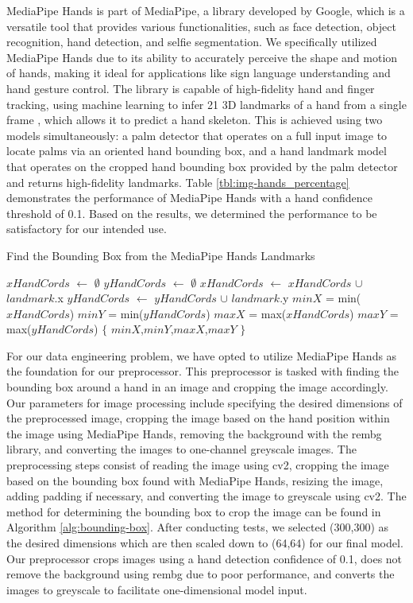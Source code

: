 \documentclass[a4paper]{article}
\begin{document}
MediaPipe Hands is part of MediaPipe, a library developed by Google, which is a versatile tool that provides various functionalities, such as face detection, object recognition, hand detection, and selfie segmentation. We specifically utilized MediaPipe Hands due to its ability to accurately perceive the shape and motion of hands, making it ideal for applications like sign language understanding and hand gesture control. The library is capable of high-fidelity hand and finger tracking, using machine learning to infer 21 3D landmarks of a hand from a single frame \citep{mediapipe}, which allows it to predict a hand skeleton. This is achieved using two models simultaneously: a palm detector that operates on a full input image to locate palms via an oriented hand bounding box, and a hand landmark model that operates on the cropped hand bounding box provided by the palm detector and returns high-fidelity landmarks. Table \ref{tbl:img-hands_percentage} demonstrates the performance of MediaPipe Hands with a hand confidence threshold of 0.1. Based on the results, we determined the performance to be satisfactory for our intended use.

\begin{algorithm}
	\caption{Find the Bounding Box from the MediaPipe Hands Landmarks} 
	\label{alg:bounding-box}
	\begin{algorithmic}[1]
	\State $xHandCords$ $\gets$ $\emptyset$
	\State $yHandCords$ $\gets$ $\emptyset$
			\State $xHandCords$ $\gets$ $xHandCords$ $\cup$ $landmark$.x
			\State $yHandCords$ $\gets$ $yHandCords$ $\cup$ $landmark$.y
		\EndFor
		\State $minX$ = min($xHandCords$)
		\State $minY$ = min($yHandCords$)
		\State $maxX$ = max($xHandCords$)
		\State $maxY$ = max($yHandCords$)
		\State \Return $\{$ $minX$,$minY$,$maxX$,$maxY$ $\}$
	\end{algorithmic} 
\end{algorithm}


For our data engineering problem, we have opted to utilize MediaPipe Hands as the foundation for our preprocessor. This preprocessor is tasked with finding the bounding box around a hand in an image and cropping the image accordingly. Our parameters for image processing include specifying the desired dimensions of the preprocessed image, cropping the image based on the hand position within the image using MediaPipe Hands, removing the background with the rembg library, and converting the images to one-channel greyscale images. The preprocessing steps consist of reading the image using cv2, cropping the image based on the bounding box found with MediaPipe Hands, resizing the image, adding padding if necessary, and converting the image to greyscale using cv2. The method for determining the bounding box to crop the image can be found in Algorithm \ref{alg:bounding-box}. After conducting tests, we selected (300,300) as the desired dimensions which are then scaled down to (64,64) for our final model. Our preprocessor crops images using a hand detection confidence of 0.1, does not remove the background using rembg due to poor performance, and converts the images to greyscale to facilitate one-dimensional model input.
\end{document}
